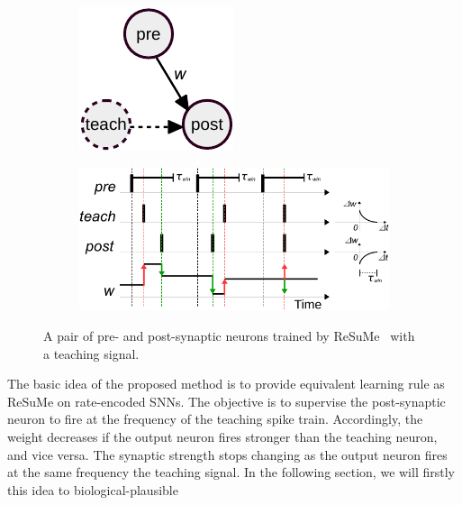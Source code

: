 \begin{figure}
	\centering
\begin{subfigure}[c]{0.25\textwidth}
		\includegraphics[width=\textwidth]{pics_sdlm/resume.pdf}
	\end{subfigure}
		\begin{subfigure}[c]{0.7\textwidth}
			\includegraphics[width=\textwidth]{pics_sdlm/resume2.pdf}
		\end{subfigure}
	\caption{A pair of pre- and post-synaptic neurons trained by ReSuMe~\citep{ponulak2010supervised} with a teaching signal.}
	\label{fig:resume}
\end{figure}

The basic idea of the proposed method is to provide \protect{} equivalent learning rule as ReSuMe on rate-encoded SNNs.
The objective is to supervise the post-synaptic neuron to fire at the frequency of the teaching spike train. 
Accordingly, the weight decreases if the output neuron fires stronger than the teaching neuron, and vice versa.
The synaptic strength stops changing as the output neuron fires at the same frequency \protect{} \protect{} the teaching signal.
In the following section, we will firstly \protect{} \protect{} this idea \protect{} \protect{} to \protect{} \protect{} biological-plausible \protect{} \protect{}


